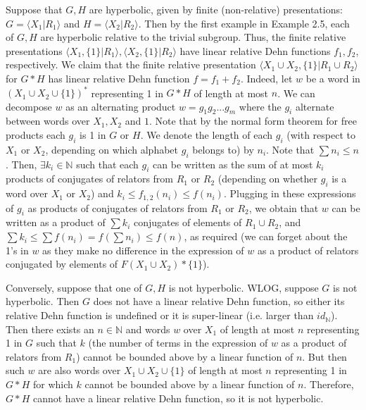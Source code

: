 \documentclass[12pt]{article}
\newcommand{\vs}{\vskip10pt}
\begin{document}
	Suppose that $G,H$ are hyperbolic, given by finite (non-relative) presentations: $G = \langle X_1 \vert R_1 \rangle$ and $H = \langle X_2 \vert R_2 \rangle$. Then by the first example in Example 2.5, each of $G,H$ are hyperbolic relative to the trivial subgroup. Thus, the finite relative presentations $\langle X_1, \{1\} \vert R_1 \rangle, \langle X_2, \{1\} \vert R_2 \rangle$ have linear relative Dehn functions $f_1, f_2$, respectively. We claim that the finite relative presentation $\langle X_1 \cup X_2, \{1\} \vert R_1 \cup R_2 \rangle$ for $G * H$ has linear relative Dehn function $f = f_1 + f_2$. Indeed, let $w$ be a word in $(X_1 \cup X_2 \cup \{1\})^*$ representing 1 in $G * H$ of length at most $n$. We can decompose $w$ as an alternating product $w = g_1 g_2 ... g_m$ where the $g_i$ alternate between words over $X_1, X_2$ and $1$. Note that by the normal form theorem for free products each $g_i$ is 1 in $G$ or $H$. We denote the length of each $g_i$ (with respect to $X_1$ or $X_2$, depending on which alphabet $g_i$ belongs to) by $n_i$. Note that $\sum n_i \leq n$. Then, $\exists k_i \in \mathbb{N}$ such that each $g_i$ can be written as the sum of at most $k_i$ products of conjugates of relators from $R_1$ or $R_2$ (depending on whether $g_i$ is a word over $X_1$ or $X_2$) and $k_i \leq f_{1,2}(n_i) \leq f(n_i)$. Plugging in these expressions of $g_i$ as products of conjugates of relators from $R_1$ or $R_2$, we obtain that $w$ can be written as a product of $\sum k_i$ conjugates of elements of $R_1 \cup R_2$, and $\sum k_i \leq \sum f(n_i) = f (\sum n_i) \leq f(n)$, as required (we can forget about the 1's in $w$ as they make no difference in the expression of $w$ as a product of relators conjugated by elements of $F(X_1 \cup X_2) * \{1\}$). 
	
	\vs 
	
	Conversely, suppose that one of $G,H$ is not hyperbolic. WLOG, suppose $G$ is not hyperbolic. Then $G$ does not have a linear relative Dehn function, so either its relative Dehn function is undefined or it is super-linear (i.e. larger than $id_{\mathbb{N}}$). Then there exists an $n \in \mathbb{N}$ and words $w$ over $X_1$ of length at most $n$ representing 1 in $G$ such that $k$ (the number of terms in the expression of $w$ as a product of relators from $R_1$) cannot be bounded above by a linear function of $n$. But then such $w$ are also words over $X_1 \cup X_2 \cup \{1\}$ of length at most $n$ representing 1 in $G * H$ for which $k$ cannot be bounded above by a linear function of $n$. Therefore, $G * H$ cannot have a linear relative Dehn function, so it is not hyperbolic. 
	
\end{document}
